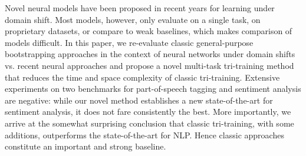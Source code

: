 Novel neural models have been proposed in recent years for learning under domain shift. Most models, however, only evaluate on a single task, on proprietary datasets, or compare to weak baselines, which makes comparison of models difficult. In this paper, we re-evaluate classic general-purpose bootstrapping approaches in the context of neural networks under domain shifts vs. recent neural approaches and propose a novel multi-task tri-training method that reduces the time and space complexity of classic tri-training. Extensive experiments on two benchmarks for part-of-speech tagging and sentiment analysis are negative: while our novel method establishes a new state-of-the-art for sentiment analysis, it does not fare consistently the best. More importantly, we arrive at the somewhat surprising conclusion that classic tri-training, with some additions, outperforms the state-of-the-art for NLP. Hence classic approaches constitute an important and strong baseline.
